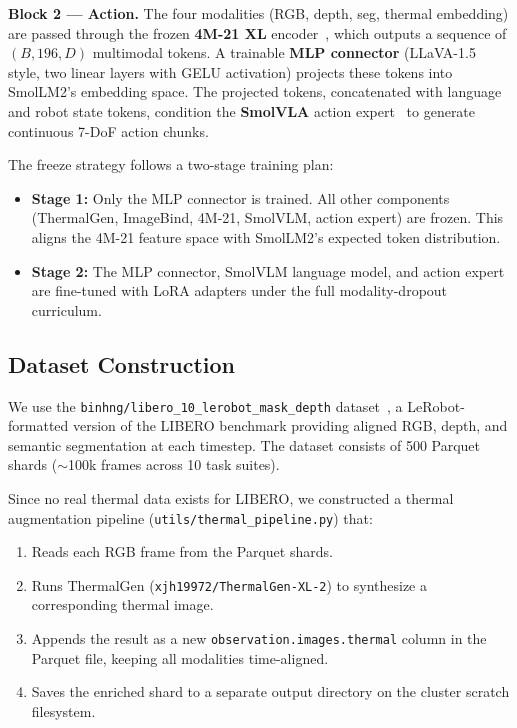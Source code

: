 \documentclass[10pt,conference,compsocconf]{IEEEtran}
\begin{document}
\textbf{Block 2 — Action.} The four modalities (RGB, depth, seg, thermal embedding) are passed through the frozen \textbf{4M-21 XL} encoder~\cite{bachmann2024fourm}, which outputs a sequence of $(B, 196, D)$ multimodal tokens. A trainable \textbf{MLP connector} (LLaVA-1.5 style, two linear layers with GELU activation) projects these tokens into SmolLM2's embedding space. The projected tokens, concatenated with language and robot state tokens, condition the \textbf{SmolVLA} action expert~\cite{shukor2025smolvla} to generate continuous 7-DoF action chunks.

The freeze strategy follows a two-stage training plan:
\begin{itemize}
    \item \textbf{Stage 1:} Only the MLP connector is trained. All other components (ThermalGen, ImageBind, 4M-21, SmolVLM, action expert) are frozen. This aligns the 4M-21 feature space with SmolLM2's expected token distribution.
    \item \textbf{Stage 2:} The MLP connector, SmolVLM language model, and action expert are fine-tuned with LoRA adapters under the full modality-dropout curriculum.
\end{itemize}

\subsection{Dataset Construction}

We use the \texttt{binhng/libero\_10\_lerobot\_mask\_depth} dataset~\cite{fei2025libero}, a LeRobot-formatted version of the LIBERO benchmark providing aligned RGB, depth, and semantic segmentation at each timestep. The dataset consists of 500 Parquet shards ($\sim$100k frames across 10 task suites).

Since no real thermal data exists for LIBERO, we constructed a thermal augmentation pipeline (\texttt{utils/thermal\_pipeline.py}) that:
\begin{enumerate}
    \item Reads each RGB frame from the Parquet shards.
    \item Runs ThermalGen (\texttt{xjh19972/ThermalGen-XL-2}) to synthesize a corresponding thermal image.
    \item Appends the result as a new \texttt{observation.images.thermal} column in the Parquet file, keeping all modalities time-aligned.
    \item Saves the enriched shard to a separate output directory on the cluster scratch filesystem.
\end{enumerate}
\end{document}
